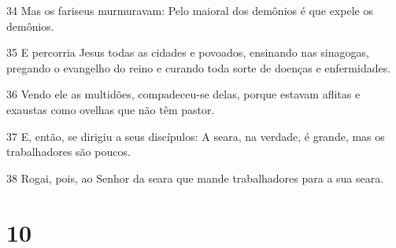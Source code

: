 \par 34 Mas os fariseus murmuravam: Pelo maioral dos demônios é que expele os demônios.
\par 35 E percorria Jesus todas as cidades e povoados, ensinando nas sinagogas, pregando o evangelho do reino e curando toda sorte de doenças e enfermidades.
\par 36 Vendo ele as multidões, compadeceu-se delas, porque estavam aflitas e exaustas como ovelhas que não têm pastor.
\par 37 E, então, se dirigiu a seus discípulos: A seara, na verdade, é grande, mas os trabalhadores são poucos.
\par 38 Rogai, pois, ao Senhor da seara que mande trabalhadores para a sua seara.

\chapter{10}

